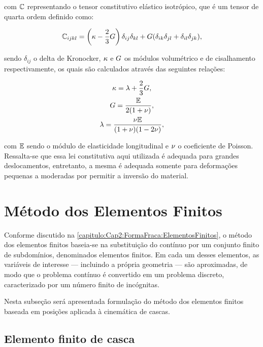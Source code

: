 \noindent com $\mathbb{C}$ representando o tensor constitutivo elástico isotrópico, que é um tensor de quarta ordem definido como:

\begin{gather}
	\mathbb{C}_{ijkl}=\left(\kappa - \frac{2}{3}G \right)\delta_{ij}\delta_{kl} + G(\delta_{ik}\delta_{jl}+\delta_{il}\delta_{jk}),
\end{gather}

\noindent sendo $\delta_{ij}$ o delta de Kronocker, $\kappa$ e $G$ os módulos volumétrico e de cisalhamento respectivamente, os quais são calculados através das seguintes relações:

\begin{gather}
	\kappa=\lambda+\frac{2}{3}G,\\
	G=\frac{\mathbb{E}}{2(1+\nu)},\\
	\lambda=\frac{\nu \mathbb{E}}{(1+\nu)(1-2\nu)},
\end{gather}

\noindent com $\mathbb{E}$ sendo o módulo de elasticidade longitudinal e $\nu$ o coeficiente de Poisson. Ressalta-se que essa lei constitutiva aqui utilizada é adequada para grandes deslocamentos, entretanto, a mesma é adequada somente para deformações pequenas a moderadas por permitir a inversão do material.

\section{Método dos Elementos Finitos}

Conforme discutido na \autoref{capitulo:Cap2:FormaFraca:ElementosFinitos}, o método dos elementos finitos baseia-se na substituição do contínuo por um conjunto finito de subdomínios, denominados elementos finitos. Em cada um desses elementos, as variáveis de interesse — incluindo a própria geometria — são aproximadas, de modo que o problema contínuo é convertido em um problema discreto, caracterizado por um número finito de incógnitas.

Nesta subseção será apresentada formulação do método dos elementos finitos baseada em posições aplicada à cinemática de cascas.

\subsection{Elemento finito de casca} \label{capitulo:Cap4:Mef:Casca}

